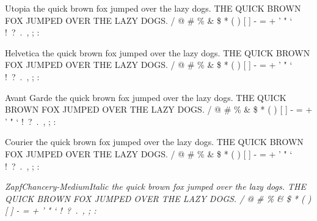 \documentclass{article}
\begin{document}
\par
{\selectfont
Utopia \newline
the quick brown fox jumped over the lazy dogs. \newline
THE QUICK BROWN FOX JUMPED OVER THE LAZY DOGS.  / @ \# \% \& \$ * ( ) [ ] - = + ' " ` !\ ?\ .\ , ; : }
\par
{\selectfont
Helvetica \newline
the quick brown fox jumped over the lazy dogs. \newline
THE QUICK BROWN FOX JUMPED OVER THE LAZY DOGS.  / @ \# \% \& \$ * ( ) [ ] - = + ' " ` !\ ?\ .\ , ; : } 
\par
{\selectfont
Avant Garde \newline
the quick brown fox jumped over the lazy dogs. \newline
THE QUICK BROWN FOX JUMPED OVER THE LAZY DOGS.  / @ \# \% \& \$ * ( ) [ ] - = + ' " ` !\ ?\ .\ , ; : } 
\par
{\selectfont
Courier \newline
the quick brown fox jumped over the lazy dogs. \newline
THE QUICK BROWN FOX JUMPED OVER THE LAZY DOGS.  / @ \# \% \& \$ * ( ) [ ] - = + ' " ` !\ ?\ .\ , ; : } 
\par
{\itshape{}\selectfont
ZapfChancery-MediumItalic \newline
the quick brown fox jumped over the lazy dogs. \newline
THE QUICK BROWN FOX JUMPED OVER THE LAZY DOGS.  / @ \# \% \& \$ * ( ) [ ] - = + ' " ` !\ ?\ .\ , ; : }
\end{document}
